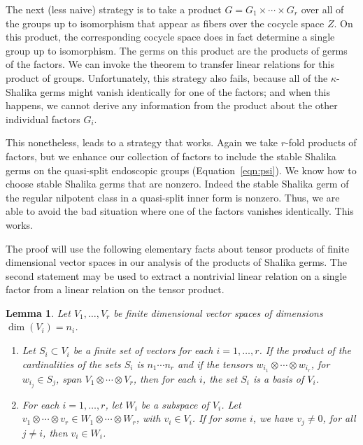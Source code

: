 \documentclass[12pt]{amsart}
\theoremstyle{plain}
\newtheorem{lem}[thm]{Lemma}
\theoremstyle{definition}
\begin{document}
The next (less naive) strategy is to take a product $G =
G_1\times\cdots\times G_r$ over all of the groups up to isomorphism
that appear as fibers over the cocycle space $Z$.  On this product,
the corresponding cocycle space does in fact determine a single group
up to isomorphism.  The germs on this product are the products of
germs of the factors.  We can invoke the theorem to transfer linear
relations for this product of groups.  Unfortunately, this strategy
also fails, because all of the $\kappa$-Shalika germs might vanish
identically for one of the factors; and when this happens, we cannot
derive any information from the product about the other individual
factors $G_i$.

This nonetheless, leads to a strategy that works.  Again we take
$r$-fold products of factors, but we enhance our collection of factors
to include the stable Shalika germs on the quasi-split endoscopic
groups (Equation~\ref{eqn:psi}).  We know how to choose stable Shalika
germs that are nonzero.  Indeed the stable Shalika germ of the regular
nilpotent class in a quasi-split inner form is nonzero.  Thus, we are
able to avoid the bad situation where one of the factors vanishes
identically.  This works.

The proof will use the following elementary facts about tensor
products of finite dimensional vector spaces in our analysis of the
products of Shalika germs.  The second statement may be used to
extract a nontrivial linear relation on a single factor from a linear
relation on the tensor product.

\begin{lem}\label{thm:tensor}
Let $V_1,\ldots,V_r$ be finite dimensional vector spaces of
dimensions $\dim(V_i) = n_i$.  
\begin{enumerate}
\item 
Let $S_i\subset V_i$ be a finite set of vectors for each
  $i = 1,\ldots,r$. 
If the product of the cardinalities of the
  sets $S_i$ is $n_1\cdots n_r$ and if the tensors $w_{i_1}\otimes
 \cdots\otimes w_{i_r}$, for $w_{i_j}\in S_j$, span 
$V_1\otimes\cdots\otimes V_r$, then
  for each $i$, the set $S_i$ is a basis of $V_i$.
\item For each $i=1,\ldots,r$, let $W_i$ be a subspace of $V_i$.  Let
  $v_{1}\otimes \cdots \otimes v_{r} \in W_1\otimes\cdots\otimes W_r$,
  with $v_{i}\in V_i$.  If for some $i$, we have $v_{j}\ne0$, for all
  $j\ne i$, then $v_{i}\in W_i$.
\end{enumerate}
\end{lem}
\end{document}
